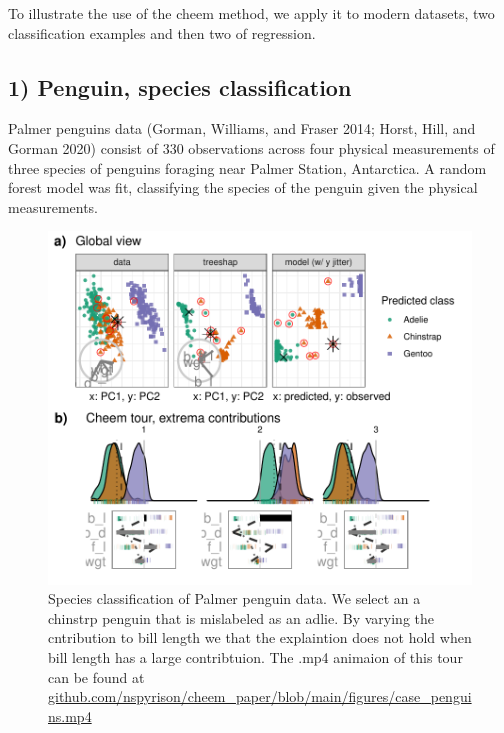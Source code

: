 \documentclass[
  article]{article}
\begin{document}
To illustrate the use of the cheem method, we apply it to modern datasets, two classification examples and then two of regression.

\hypertarget{penguin-species-classification}{%
\subsection{1) Penguin, species classification}\label{penguin-species-classification}}

Palmer penguins data (Gorman, Williams, and Fraser 2014; Horst, Hill, and Gorman 2020) consist of 330 observations across four physical measurements of three species of penguins foraging near Palmer Station, Antarctica. A random forest model was fit, classifying the species of the penguin given the physical measurements.



\begin{figure}

{\centering \includegraphics[width=1\linewidth]{./figures/case_penguins} 

}

\caption{Species classification of Palmer penguin data. We select an a chinstrp penguin that is mislabeled as an adlie. By varying the cntribution to bill length we that the explaintion does not hold when bill length has a large contribtuion. The .mp4 animaion of this tour can be found at \href{https://github.com/nspyrison/cheem_paper/blob/main/figures/case_penguins.mp4}{github.com/nspyrison/cheem\_paper/blob/main/figures/case\_penguins.mp4}}\label{fig:casepenguins}
\end{figure}
\end{document}
